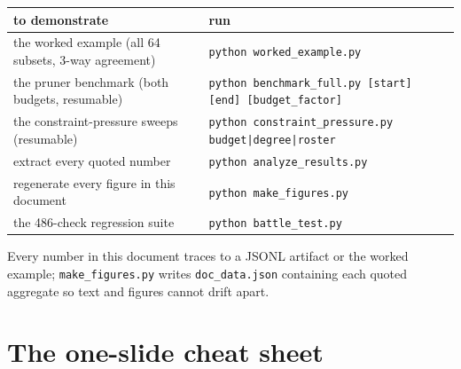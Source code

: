 \documentclass[11pt]{article}
\newenvironment{card}{%
  \def\FrameCommand{\fboxsep=8pt\fcolorbox{cardline}{cardbg}}%
  \MakeFramed{\advance\hsize-\width\FrameRestore}\noindent}{\endMakeFramed}
\newcommand{\code}[1]{\texttt{#1}}
\begin{document}
\begin{card}
\begin{tabular}{ll}
\toprule
to demonstrate & run \\
\midrule
the worked example (all 64 subsets, 3-way agreement) &
\code{python worked\_example.py} \\
the pruner benchmark (both budgets, resumable) &
\code{python benchmark\_full.py [start] [end] [budget\_factor]} \\
the constraint-pressure sweeps (resumable) &
\code{python constraint\_pressure.py budget|degree|roster} \\
extract every quoted number & \code{python analyze\_results.py} \\
regenerate every figure in this document & \code{python make\_figures.py} \\
the 486-check regression suite & \code{python battle\_test.py} \\
\bottomrule
\end{tabular}
\end{card}

Every number in this document traces to a JSONL artifact or the worked
example; \code{make\_figures.py} writes \code{doc\_data.json} containing
each quoted aggregate so text and figures cannot drift apart.

\section{The one-slide cheat sheet}
\end{document}
